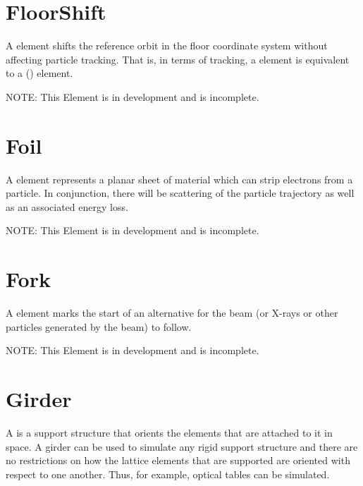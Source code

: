 \section{FloorShift}
\label{s:floorshift}

A  element shifts the reference orbit in the floor coordinate system without
affecting particle tracking. That is, in terms of tracking, a  element is equivalent
to a  () element. 

NOTE: This Element is in development and is incomplete.

\section{Foil}
\label{s:foil}

A  element represents a planar sheet of material which can strip electrons from a particle.
In conjunction, there will be scattering of the particle trajectory as well as an associated energy
loss.

NOTE: This Element is in development and is incomplete.

\section{Fork}
\label{s:fork}

A  element marks the start of an alternative  for the beam
(or X-rays or other particles generated by the beam) to follow.

NOTE: This Element is in development and is incomplete.

\section{Girder}
\label{s:girder}

A  is a support structure that orients the elements that are attached to it in space. A
girder can be used to simulate any rigid support structure and there are no restrictions on how the
lattice elements that are supported are oriented with respect to one another.  Thus, for example,
optical tables can be simulated.

